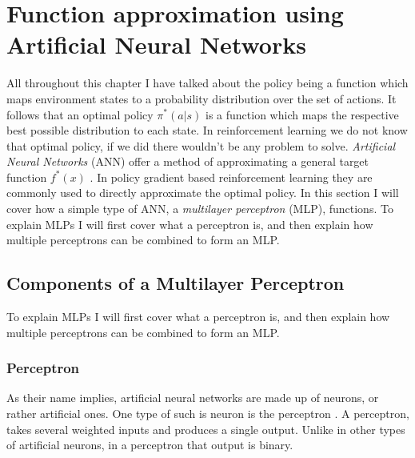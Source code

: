 \newpage
\section{Function approximation using Artificial Neural Networks}\label{sec:neural_networks}
All throughout this chapter I have talked about the policy being a function which maps environment states to a probability distribution over the set of actions. It follows that an optimal policy $\pi^*(a|s)$ is a function which maps the respective best possible distribution to each state. In reinforcement learning we do not know that optimal policy, if we did there wouldn't be any problem to solve. \textit{Artificial Neural Networks} (ANN) offer a method of approximating a general target function $f^*(x)$ \cite[p. 164]{Goodfellow-et-al-2016}. In policy gradient based reinforcement learning they are commonly used to directly approximate the optimal policy. In this section I will cover how a simple type of ANN, a \textit{multilayer perceptron} (MLP), functions. To explain MLPs I will first cover what a perceptron is, and then explain how multiple perceptrons can be combined to form an MLP.

\subsection{Components of a Multilayer Perceptron}\label{subsec:nn:components_mlp}
To explain MLPs I will first cover what a perceptron is, and then explain how multiple perceptrons can be combined to form an MLP.

\subsubsection{Perceptron}\label{subsubsec:nn:comp:perceptron}
As their name implies, artificial neural networks are made up of neurons, or rather artificial ones. One type of such is neuron is the perceptron \cite[chap. 1]{nielsen_neural_2015}. A perceptron, takes several weighted inputs and produces a single output. Unlike in other types of artificial neurons, in a perceptron that output is binary. 

